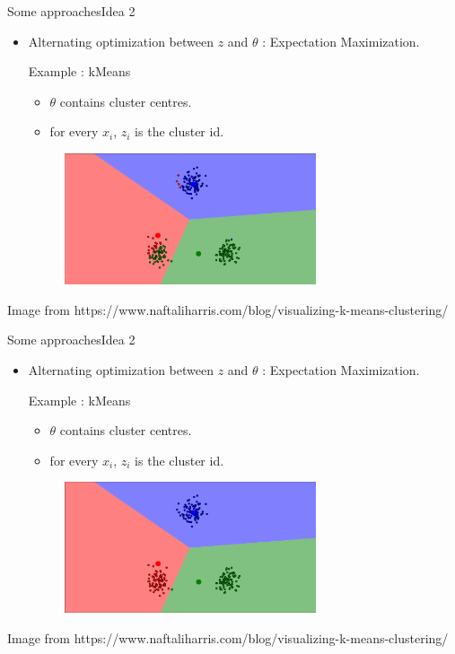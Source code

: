 \documentclass{beamer}
\begin{document}
\begin{frame}{Some approaches}{Idea 2}
    \begin{itemize}
        \item {
            Alternating optimization between $z$ and $\theta$ : Expectation Maximization.

            \vspace{3mm}
            Example : kMeans
            \begin{itemize}
                \item $\theta$ contains cluster centres.
                \item for every $x_i$, $z_i$ is the cluster id.
            \end{itemize}
        }
        \begin{figure}
            \centering
            \includegraphics[width=0.7\textwidth]{kmeans4}
        \end{figure}
    \end{itemize}
    {\small Image from https://www.naftaliharris.com/blog/visualizing-k-means-clustering/}
\end{frame}
\begin{frame}{Some approaches}{Idea 2}
    \begin{itemize}
        \item {
            Alternating optimization between $z$ and $\theta$ : Expectation Maximization.

            \vspace{3mm}
            Example : kMeans
            \begin{itemize}
                \item $\theta$ contains cluster centres.
                \item for every $x_i$, $z_i$ is the cluster id.
            \end{itemize}
        }
        \begin{figure}
            \centering
            \includegraphics[width=0.7\textwidth]{kmeans5}
        \end{figure}
    \end{itemize}
    {\small Image from https://www.naftaliharris.com/blog/visualizing-k-means-clustering/}
\end{frame}
\end{document}
